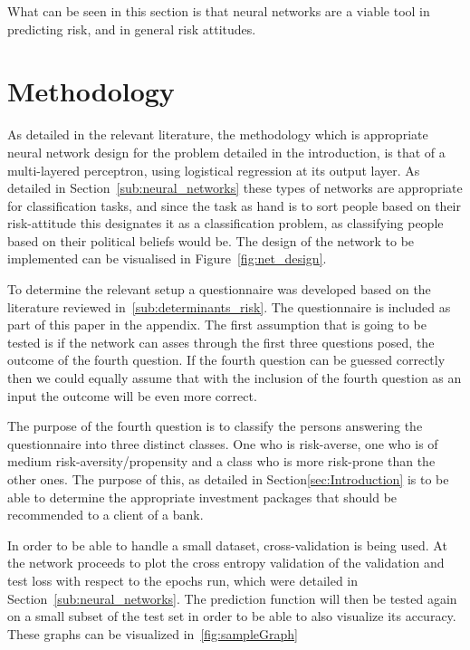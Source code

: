 \documentclass{article}
\begin{document}
What can be seen in this section is that neural networks are a viable tool in predicting risk, and in general risk attitudes.
\section{Methodology}
\label{sec:methodology}

As detailed in the relevant literature, the methodology which is appropriate neural network design for the problem detailed in the introduction, is that of a multi-layered perceptron, using logistical regression at its output layer. As detailed in Section~\ref{sub:neural_networks} these types of networks are appropriate for classification tasks, and since the task as hand is to sort people based on their risk-attitude this designates it as a classification problem, as classifying people based on their political beliefs would be. The design of the network to be implemented can be visualised in Figure~\ref{fig:net_design}. 

To determine the relevant setup a questionnaire was developed based on the literature reviewed in~\ref{sub:determinants_risk}. The questionnaire is included as part of this paper in the appendix. The first assumption that is going to be tested is if the network can asses through the first three questions posed, the outcome of the fourth question. If the fourth question can be guessed correctly then we could equally assume that with the inclusion of the fourth question as an input the outcome will be even more correct. 

The purpose of the fourth question is to classify the persons answering the questionnaire into three distinct classes. One who is risk-averse, one who is of medium risk-aversity/propensity and a class who is more risk-prone than the other ones. The purpose of this, as detailed in Section\ref{sec:Introduction} is to be able to determine the appropriate investment packages that should be recommended to a client of a bank.

In order to be able to handle a small dataset, cross-validation is being used. At the network proceeds to plot the cross entropy validation of the validation and test loss with respect to the epochs run, which were detailed in Section~\ref{sub:neural_networks}. The prediction function will then be tested again on a small subset of the test set in order to be able to also visualize its accuracy. These graphs can be visualized in~\ref{fig:sampleGraph}
\end{document}
